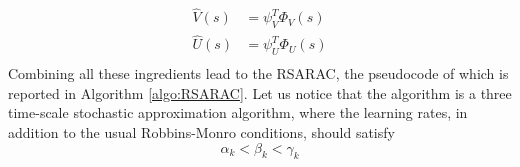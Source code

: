 \begin{equation}
	\begin{split}
		\widehat{V}(s) &= \psi_V^T \Phi_V(s)\\
		\widehat{U}(s) &= \psi_U^T \Phi_U(s)\\
	\end{split}
\end{equation}
Combining all these ingredients lead to the \gls{RSARAC}, the pseudocode of which is reported in Algorithm \ref{algo:RSARAC}.
Let us notice that the algorithm is a three time-scale stochastic approximation algorithm, where the learning rates, in addition to the usual Robbins-Monro conditions, should satisfy
\begin{equation*}
	\alpha_k < \beta_k < \gamma_k
\end{equation*}

